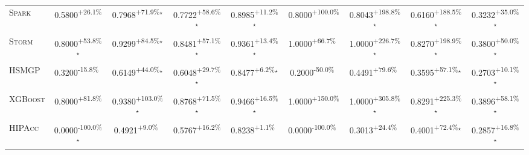 \begin{table}[htbp]
\begin{tabular}{l|cccc|cccc}
\textsc{Spark} & \cellcolor{green!30}0.5800\textsuperscript{+26.1\%}$^{\,\,\,}$ & \cellcolor{green!30}0.7968\textsuperscript{+71.9\%}$^\star$ & \cellcolor{green!30}0.7722\textsuperscript{+58.6\%}$^\star$ & \cellcolor{green!30}0.8985\textsuperscript{+11.2\%}$^\star$ & \cellcolor{green!30}0.8000\textsuperscript{+100.0\%}$^{\,\,\,}$ & \cellcolor{green!30}0.8043\textsuperscript{+198.8\%}$^\star$ & \cellcolor{green!30}0.6160\textsuperscript{+188.5\%}$^\star$ & \cellcolor{green!30}0.3232\textsuperscript{+35.0\%}$^\star$ \\
\textsc{Storm} & \cellcolor{green!30}0.8000\textsuperscript{+53.8\%}$^\star$ & \cellcolor{green!30}0.9299\textsuperscript{+84.5\%}$^\star$ & \cellcolor{green!30}0.8481\textsuperscript{+57.1\%}$^\star$ & \cellcolor{green!30}0.9361\textsuperscript{+13.4\%}$^\star$ & \cellcolor{green!30}1.0000\textsuperscript{+66.7\%}$^{\,\,\,}$ & \cellcolor{green!30}1.0000\textsuperscript{+226.7\%}$^\star$ & \cellcolor{green!30}0.8270\textsuperscript{+198.9\%}$^\star$ & \cellcolor{green!30}0.3800\textsuperscript{+50.0\%}$^\star$ \\
\textsc{HSMGP} & \cellcolor{red!30}0.3200\textsuperscript{-15.8\%}$^{\,\,\,}$ & \cellcolor{green!30}0.6149\textsuperscript{+44.0\%}$^\star$ & \cellcolor{green!30}0.6048\textsuperscript{+29.7\%}$^\star$ & \cellcolor{green!30}0.8477\textsuperscript{+6.2\%}$^\star$ & \cellcolor{red!30}0.2000\textsuperscript{-50.0\%}$^{\,\,\,}$ & \cellcolor{green!30}0.4491\textsuperscript{+79.6\%}$^{\,\,\,}$ & \cellcolor{green!30}0.3595\textsuperscript{+57.1\%}$^\star$ & \cellcolor{green!30}0.2703\textsuperscript{+10.1\%}$^\star$ \\
\textsc{XGBoost} & \cellcolor{green!30}0.8000\textsuperscript{+81.8\%}$^{\,\,\,}$ & \cellcolor{green!30}0.9380\textsuperscript{+103.0\%}$^\star$ & \cellcolor{green!30}0.8768\textsuperscript{+71.5\%}$^\star$ & \cellcolor{green!30}0.9466\textsuperscript{+16.5\%}$^\star$ & \cellcolor{green!30}1.0000\textsuperscript{+150.0\%}$^{\,\,\,}$ & \cellcolor{green!30}1.0000\textsuperscript{+305.8\%}$^\star$ & \cellcolor{green!30}0.8291\textsuperscript{+225.3\%}$^\star$ & \cellcolor{green!30}0.3896\textsuperscript{+58.1\%}$^\star$ \\
\textsc{HIPAcc} & \cellcolor{red!30}0.0000\textsuperscript{-100.0\%}$^\star$ & \cellcolor{green!30}0.4921\textsuperscript{+9.0\%}$^{\,\,\,}$ & \cellcolor{green!30}0.5767\textsuperscript{+16.2\%}$^{\,\,\,}$ & \cellcolor{green!30}0.8238\textsuperscript{+1.1\%}$^{\,\,\,}$ & \cellcolor{red!30}0.0000\textsuperscript{-100.0\%}$^{\,\,\,}$ & \cellcolor{green!30}0.3013\textsuperscript{+24.4\%}$^{\,\,\,}$ & \cellcolor{green!30}0.4001\textsuperscript{+72.4\%}$^\star$ & \cellcolor{green!30}0.2857\textsuperscript{+16.8\%}$^\star$ \\

\end{tabular}
\end{table}

